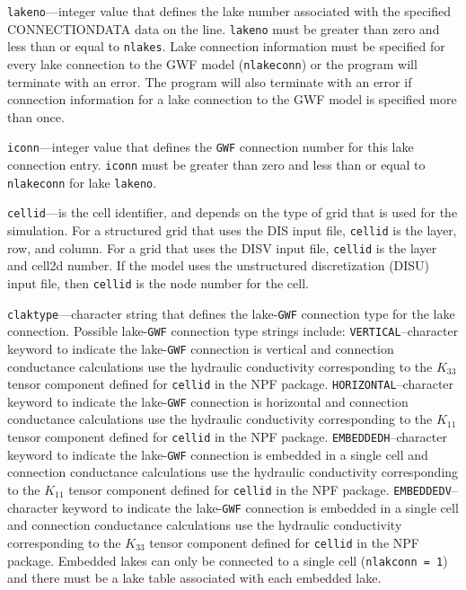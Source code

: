 \begin{description}
\item \texttt{lakeno}---integer value that defines the lake number associated with the specified CONNECTIONDATA data on the line. \texttt{lakeno} must be greater than zero and less than or equal to \texttt{nlakes}. Lake connection information must be specified for every lake connection to the GWF model (\texttt{nlakeconn}) or the program will terminate with an error.  The program will also terminate with an error if connection information for a lake connection to the GWF model is specified more than once.

\item \texttt{iconn}---integer value that defines the \texttt{GWF} connection number for this lake connection entry. \texttt{iconn} must be greater than zero and less than or equal to \texttt{nlakeconn} for lake \texttt{lakeno}.

\item \texttt{cellid}---is the cell identifier, and depends on the type of grid that is used for the simulation.  For a structured grid that uses the DIS input file, \texttt{cellid} is the layer, row, and column.   For a grid that uses the DISV input file, \texttt{cellid} is the layer and cell2d number.  If the model uses the unstructured discretization (DISU) input file, then \texttt{cellid} is the node number for the cell.

\item \texttt{claktype}---character string that defines the lake-\texttt{GWF} connection type for the lake connection. Possible lake-\texttt{GWF} connection type strings include:  \texttt{VERTICAL}--character keyword to indicate the lake-\texttt{GWF} connection is vertical  and connection conductance calculations use the hydraulic conductivity corresponding to the $K_{33}$ tensor component defined for \texttt{cellid} in the NPF package. \texttt{HORIZONTAL}--character keyword to indicate the lake-\texttt{GWF} connection is horizontal and connection conductance calculations use the hydraulic conductivity corresponding to the $K_{11}$ tensor component defined for \texttt{cellid} in the NPF package. \texttt{EMBEDDEDH}--character keyword to indicate the lake-\texttt{GWF} connection is embedded in a single cell and connection conductance calculations use the hydraulic conductivity corresponding to the $K_{11}$ tensor component defined for \texttt{cellid} in the NPF package. \texttt{EMBEDDEDV}--character keyword to indicate the lake-\texttt{GWF} connection is embedded in a single cell and connection conductance calculations use the hydraulic conductivity corresponding to the $K_{33}$ tensor component defined for \texttt{cellid} in the NPF package. Embedded lakes can only be connected to a single cell (\texttt{nlakconn = 1}) and there must be a lake table associated with each embedded lake.


\end{description}
